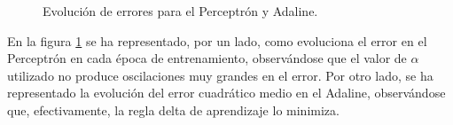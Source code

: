 \documentclass[spanish]{assignment}
\begin{document}
	\begin{center}
	\begin{figure}
		\caption{Evolución de errores para el Perceptrón y Adaline.}	
		\label{fig:p1}
	\end{figure}
	\end{center}
	En la figura \ref{fig:p1} se ha representado, por un lado, como evoluciona el error en el Perceptrón en cada época de entrenamiento, observándose que el valor de $\alpha$ utilizado no produce oscilaciones muy grandes en el error. Por otro lado, se ha representado la evolución del error cuadrático medio en el Adaline, observándose que, efectivamente, la regla delta de aprendizaje lo minimiza.
	
\end{document}
